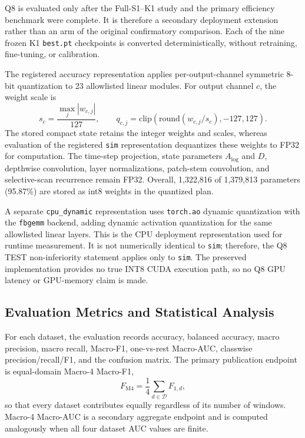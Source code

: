 Q8 is evaluated only after the Full-S1--K1 study and the primary efficiency benchmark were complete. It is therefore a secondary deployment extension rather than an arm of the original confirmatory comparison. Each of the nine frozen K1 \texttt{best.pt} checkpoints is converted deterministically, without retraining, fine-tuning, or calibration.

The registered accuracy representation applies per-output-channel symmetric 8-bit quantization to 23 allowlisted linear modules. For output channel $c$, the weight scale is
\begin{equation}
  s_c=\frac{\max_j |w_{c,j}|}{127}, \qquad
  q_{c,j}=\mathrm{clip}\left(\mathrm{round}(w_{c,j}/s_c),-127,127\right).
\end{equation}
The stored compact state retains the integer weights and scales, whereas evaluation of the registered \texttt{sim} representation dequantizes these weights to FP32 for computation. The time-step projection, state parameters $A_{\log}$ and $D$, depthwise convolution, layer normalizations, patch-stem convolution, and selective-scan recurrence remain FP32. Overall, 1,322,816 of 1,379,813 parameters (95.87\%) are stored as int8 weights in the quantized plan.

A separate \texttt{cpu\_dynamic} representation uses \texttt{torch.ao} dynamic quantization with the \texttt{fbgemm} backend, adding dynamic activation quantization for the same allowlisted linear layers. This is the CPU deployment representation used for runtime measurement. It is not numerically identical to \texttt{sim}; therefore, the Q8 TEST non-inferiority statement applies only to \texttt{sim}. The preserved implementation provides no true INT8 CUDA execution path, so no Q8 GPU latency or GPU-memory claim is made.

\subsection{Evaluation Metrics and Statistical Analysis}
\label{subsec:stats}

For each dataset, the evaluation records accuracy, balanced accuracy, macro precision, macro recall, Macro-F1, one-vs-rest Macro-AUC, classwise precision/recall/F1, and the confusion matrix. The primary publication endpoint is equal-domain Macro-4 Macro-F1,
\begin{equation}
  F_{\mathrm{M4}} = \frac{1}{4}\sum_{d\in\mathcal{D}}F_{1,d},
\end{equation}
so that every dataset contributes equally regardless of its number of windows. Macro-4 Macro-AUC is a secondary aggregate endpoint and is computed analogously when all four dataset AUC values are finite.

